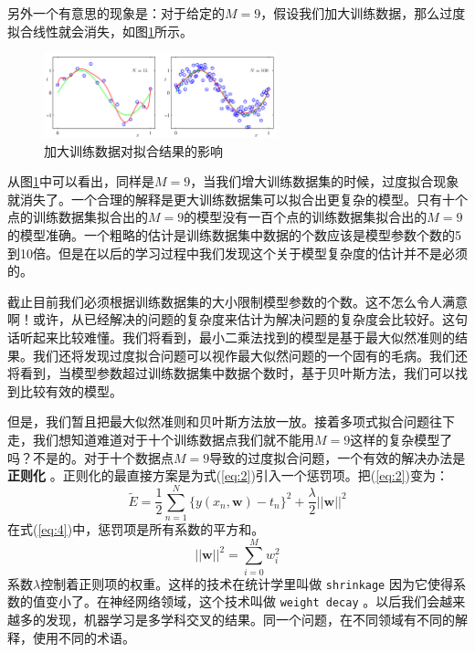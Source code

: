 \documentclass[10pt,a4paper,UTF8]{article}
\begin{document}
另外一个有意思的现象是：对于给定的\(M=9\)，假设我们加大训练数据，那么过度拟合线性就会消失，如图\ref{fig:org4149329}所示。

\begin{figure}[htbp]
\centering
\includegraphics[width=0.6\textwidth]{../../img/computer_prml/20170430figure1dot6.png}
\caption{\label{fig:org4149329}
加大训练数据对拟合结果的影响}
\end{figure}

从图\ref{fig:org4149329}中可以看出，同样是\(M=9\)，当我们增大训练数据集的时候，过度拟合现象就消失了。一个合理的解释是更大训练数据集可以拟合出更复杂的模型。只有十个点的训练数据集拟合出的\(M=9\)的模型没有一百个点的训练数据集拟合出的\(M=9\)的模型准确。一个粗略的估计是训练数据集中数据的个数应该是模型参数个数的5到10倍。但是在以后的学习过程中我们发现这个关于模型复杂度的估计并不是必须的。

截止目前我们必须根据训练数据集的大小限制模型参数的个数。这不怎么令人满意啊！或许，从已经解决的问题的复杂度来估计为解决问题的复杂度会比较好。这句话听起来比较难懂。我们将看到，最小二乘法找到的模型是基于最大似然准则的结果。我们还将发现过度拟合问题可以视作最大似然问题的一个固有的毛病。我们还将看到，当模型参数超过训练数据集中数据个数时，基于贝叶斯方法，我们可以找到比较有效的模型。

但是，我们暂且把最大似然准则和贝叶斯方法放一放。接着多项式拟合问题往下走，我们想知道难道对于十个训练数据点我们就不能用\(M=9\)这样的复杂模型了吗？不是的。对于十个数据点\(M=9\)导致的过度拟合问题，一个有效的解决办法是  \textbf{正则化}  。正则化的最直接方案是为式(\ref{eq:2})引入一个惩罚项。把(\ref{eq:2})变为：
\begin{equation}
\label{eq:4}
\tilde{E} = \frac{1}{2}\sum_{n=1}^{N} \{y(x_{n}, \mathbf{w}) - t_{n}\}^{2} + \frac{\lambda}{2} || \mathbf{w} ||^{2}
\end{equation}
在式(\ref{eq:4})中，惩罚项是所有系数的平方和。\[|| \mathbf{w}||^{2} = \sum_{i=0}^{M} w_{i}^{2}\] 系数\(\lambda\)控制着正则项的权重。这样的技术在统计学里叫做 \texttt{shrinkage} 因为它使得系数的值变小了。在神经网络领域，这个技术叫做 \texttt{weight decay} 。以后我们会越来越多的发现，机器学习是多学科交叉的结果。同一个问题，在不同领域有不同的解释，使用不同的术语。
\end{document}
